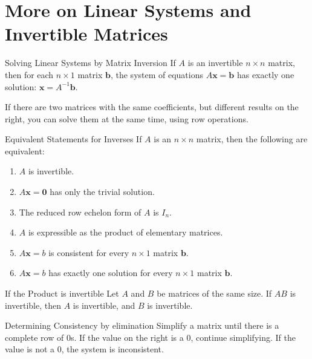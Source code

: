 \documentclass[\main/notes.tex]{subfiles}
\begin{document}
		\section[More]{More on Linear Systems and Invertible Matrices}
			\begin{theorem}{Solving Linear Systems by Matrix Inversion}
				If $A$ is an invertible $n \times n$ matrix, then for each $n \times 1$ matrix $\mathbf{b}$, the system of equations $A\mathbf{x} = \mathbf{b}$ has exactly one solution: $\mathbf{x} = A^{-1}\mathbf{b}$.
			\end{theorem}
			If there are two matrices with the same coefficients, but different results on the right, you can solve them at the same time, using row operations.
			\begin{sidenote}{Equivalent Statements for Inverses}
				If $A$ is an $n \times n$ matrix, then the following are equivalent:
				\begin{enumerate}[label=(\alph*)]
					\item $A$ is invertible.
					\item $A\mathbf{x} = \mathbf{0}$ has only the trivial solution.
					\item The reduced row echelon form of $A$ is $I_{n}$.
					\item $A$ is expressible as the product of elementary matrices.
					\item $A\mathbf{x} = b$ is consistent for every $n \times 1$ matrix $\mathbf{b}$.
					\item $A\mathbf{x} = b$ has exactly one solution for every $n \times 1$ matrix $\mathbf{b}$.
				\end{enumerate}
			\end{sidenote}
			\begin{theorem}{If the Product is invertible}
				Let $A$ and $B$ be matrices of the same size. If $AB$ is invertible, then $A$ is invertible, and $B$ is invertible.
			\end{theorem}
			\begin{sidenote}{Determining Consistency by elimination}
				Simplify a matrix until there is a complete row of $0$s. If the value on the right is a $0$, continue simplifying. If the value is not a $0$, the system is inconsistent.
			\end{sidenote}
\end{document}
